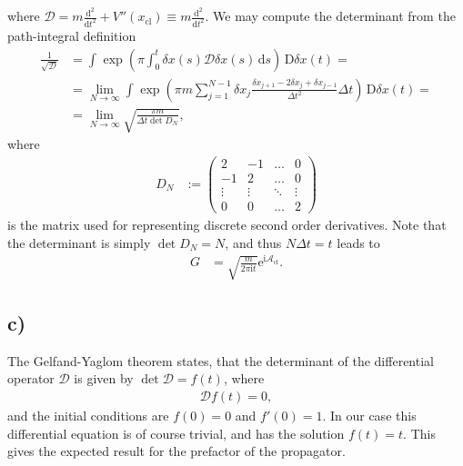 \documentclass[english, parskip=full]{scrartcl}
\newcommand{\intx}{}
\newcommand{\kla}{}
\newcommand{\tecxt}{}
\renewcommand{\i}{\text{i}}
\newcommand{\e}{\text{e}}
\begin{document}
where $\mathcal{D} = m\frac{\tecxt\text{d}^2}{\tecxt\text{d}t^2} + V''(x_\tecxt\text{cl}) \equiv m\frac{\tecxt\text{d}^2}{\tecxt\text{d}t^2}$.
We may compute the determinant from the path-integral definition
\begin{align}
\frac{1}{\sqrt{\mathcal{D}}} &= \intx\int_{}^{}\exp\kla\left( \pi \intx\int_{0}^{t} \delta x(s)\mathcal{D}\delta x(s) \, \mathrm{d}s \right)\, \mathrm{D}\delta x(t) = \\
&= \lim_{N\rightarrow\infty} \intx\int_{ }^{ }\exp\kla\left( \pi m\sum_{j=1}^{N-1}\delta x_j \frac{\delta x_{j+1} - 2\delta x_j + \delta x_{j-1}}{\Delta t^2} \Delta t \right)\, \mathrm{D}\delta x(t) = \\
&= \lim_{N\rightarrow\infty} \sqrt{\frac{\pi m}{\Delta t\det D_N}},
\end{align}
where 
\begin{align}
D_N &:= \begin{pmatrix}
2 & -1 & \dots & 0 \\ 
-1 & 2 & \dots & 0 \\
\vdots & \vdots & \ddots & \vdots \\
0 & 0 & \dots & 2
\end{pmatrix}
\end{align}
is the matrix used for representing discrete second order derivatives.
Note that the determinant is simply $\det D_N = N$, and thus $N\Delta t = t$ leads to
\begin{align}
G &=\sqrt{\frac{m}{2\pi\i t}}\e^{\i\mathcal{A}_\tecxt\text{cl}}.
\end{align}


\subsection*{c)}
The Gelfand-Yaglom theorem states, that the determinant of the differential operator $\mathcal{D}$ is given by $\det\mathcal{D} = f(t)$, where
\begin{align}
\mathcal{D}f(t) = 0,
\end{align}
and the initial conditions are $f(0) = 0$ and $f'(0) = 1$.
In our case this differential equation is of course trivial, and has the solution $f(t) = t$.
This gives the expected result for the prefactor of the propagator.
\end{document}
